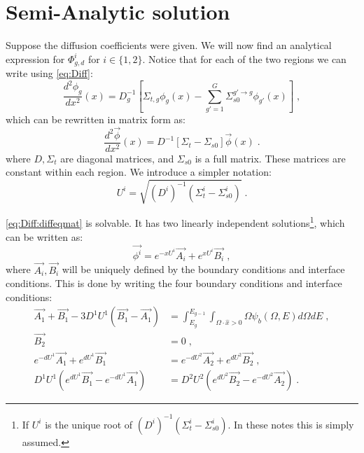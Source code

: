 \documentclass[a4paper,letterpaper,12pt,oneside,draft]{article}
\newcommand{\eec}{\;,}
\newcommand{\eep}{\;.}
\newcommand{\intg}[2][g]{\ensuremath{\int_{E_{#1}}^{E_{#1-1}} #2 dE}}
\begin{document}
\section{Semi-Analytic solution}
    Suppose the diffusion coefficients were given. We will now find an analytical expression for $\Phi_{g,d}^{i}$ for $i\in\{1,2\}$.
    Notice that for each of the two regions we can write using \cref{eq:Diff}:
    \begin{equation}
        \label{eq:Diff:diffeqsim}
        \frac{d^2\phi_g}{dx^2}(x) = D_g^{-1}\left[\Sigma_{t,g}\phi_g(x) - \sum_{g'=1}^G\Sigma_{s0}^{g'\to g}\phi_{g'}(x)\right]\eec
    \end{equation}
    which can be rewritten in matrix form as:
    \begin{equation}
    \label{eq:Diff:diffeqmat}
    \frac{d^2\vec{\phi}}{dx^2}(x) = D^{-1}\left[\Sigma_{t} - \Sigma_{s0}\right]\vec{\phi}(x)\eep
    \end{equation}
    where $D,\Sigma_t$ are diagonal matrices, and $\Sigma_{s0}$ is a full matrix. 
    These matrices are constant within each region.
    We introduce a simpler notation:
    \begin{equation}
    \label{def:U}
        U^i = \sqrt{(D^i)^{-1}\left(\Sigma_t^i - \Sigma_{s0}^i\right)}\eep
    \end{equation}
    
    \cref{eq:Diff:diffeqmat} is solvable. It has two linearly independent solutions\footnote{If $U^i$ is the unique root of $(D^i)^{-1}\left(\Sigma_t^i - \Sigma_{s0}^i\right)$. In these notes this is simply assumed.}, which can be written as:
    \begin{equation}
    \vec{\phi^i} = e^{-xU^i}\vec{A_i} + e^{xU^i}\vec{B_i} \eec
    \end{equation}
    where $\vec{A_i},\vec{B_i}$ will be uniquely defined by the boundary conditions and interface conditions.
    This is done by writing the four boundary conditions and interface conditions:
    \begin{align}
        \label{eq:BC:Left}
            \vec{A_1}+\vec{B_1} - 3D^1U^1\left(\vec{B_1}-\vec{A_1}\right) &= \intg{\int_{\Omega\cdot\hat{x}>0}\Omega\psi_b(\Omega,E)d\Omega} \eec \\
        \label{eq:BC:Right}
            \vec{B_2} &= 0 \eec \\
        \label{eq:IC:Flux}
            e^{-dU^1}\vec{A_1} + e^{dU^1}\vec{B_1} &= e^{-dU^2}\vec{A_2} + e^{dU^2}\vec{B_2} \eec \\
        \label{eq:IC:Current}
            D^1U^1\left(e^{dU^1}\vec{B_1} - e^{-dU^1}\vec{A_1}\right) &= D^2U^2\left(e^{dU^2}\vec{B_2} - e^{-dU^2}\vec{A_2}\right) \eep
    \end{align}
    
\end{document}
